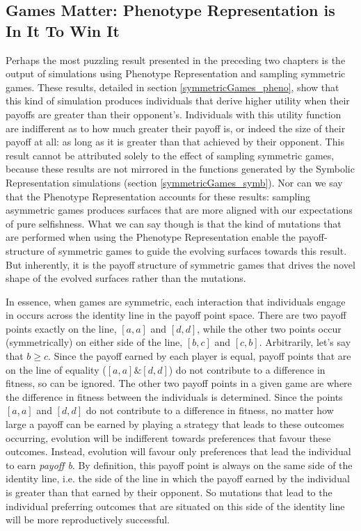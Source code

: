 \documentclass[11pt]{book}
\newcommand*{\np}{\par\noindent\newline}
\begin{document}
\subsection[Games Matter]{Games Matter: Phenotype Representation is In It To Win It}\label{win_it}
Perhaps the most puzzling result presented in the preceding two chapters is the output of simulations using Phenotype Representation and sampling symmetric games.
These results, detailed in section \ref{symmetricGames_pheno}, show that this kind of simulation produces individuals
that derive higher utility when their payoffs are greater than their opponent's.
Individuals with this utility function are indifferent as to how much greater their payoff is, or indeed the size of their payoff at all: as long as it is greater than that achieved by their opponent.
This result cannot be attributed solely to the effect of sampling symmetric games, because these results are not mirrored in the functions generated by the Symbolic Representation simulations (section \ref{symmetricGames_symb}).
Nor can we say that the Phenotype Representation accounts for these results: sampling asymmetric games produces surfaces that are more aligned with our expectations of pure selfishness.
What we can say though is that the kind of mutations that are performed when using the Phenotype Representation enable the payoff-structure of symmetric games to guide the evolving surfaces towards this result.
But inherently, it is the payoff structure of symmetric games that drives the novel shape of the evolved surfaces rather than the mutations.

\np In essence, when games are symmetric, each interaction that individuals engage in occurs across the identity line in the payoff point space.
There are two payoff points exactly on the line, $[a,a]$ and $[d,d]$, while the other two points occur (symmetrically) on either side of the line, $[b,c]$ and $[c,b]$.
Arbitrarily, let's say that $b \geq c$.
Since the payoff earned by each player is equal, payoff points that are on the line of equality ($[a,a] \& [d,d]$) do not contribute to a difference in fitness, so can be ignored.
The other two payoff points in a given game are where the difference in fitness between the individuals is determined.
Since the points $[a,a]$ and $[d,d]$ do not contribute to a difference in fitness, no matter how large a payoff can be earned by playing a strategy that leads to these outcomes occurring, evolution will be indifferent towards preferences that favour these outcomes.
Instead, evolution will favour only preferences that lead the individual to earn \textit{payoff b}.
By definition, this payoff point is always on the same side of the identity line, i.e. the side of the line in which the payoff earned by the individual is greater than that earned by their opponent.
So mutations that lead to the individual preferring outcomes that are situated on this side of the identity line will be more reproductively successful.
\end{document}

